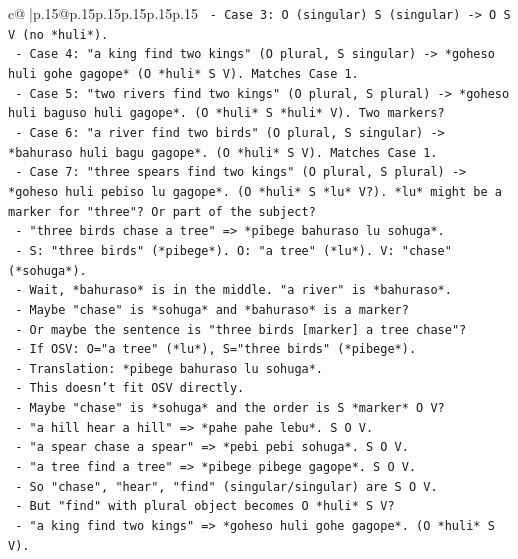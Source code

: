 \documentclass{article}
\begin{document}
{\begin{supertabular}{c@{$\;$}|p{.15\linewidth}@{}p{.15\linewidth}p{.15\linewidth}p{.15\linewidth}p{.15\linewidth}p{.15\linewidth}}
{{{\texttt{      {-} Case 3: O (singular) S (singular) {-}> O S V (no *huli*).} \\
\texttt{      {-} Case 4: "a king find two kings" (O plural, S singular) {-}> *goheso huli gohe gagope* (O *huli* S V). Matches Case 1.} \\
\texttt{      {-} Case 5: "two rivers find two kings" (O plural, S plural) {-}> *goheso huli baguso huli gagope*. (O *huli* S *huli* V). Two markers?} \\
\texttt{      {-} Case 6: "a river find two birds" (O plural, S singular) {-}> *bahuraso huli bagu gagope*. (O *huli* S V). Matches Case 1.} \\
\texttt{      {-} Case 7: "three spears find two kings" (O plural, S plural) {-}> *goheso huli pebiso lu gagope*. (O *huli* S *lu* V?). *lu* might be a marker for "three"? Or part of the subject?} \\
\texttt{      {-} "three birds chase a tree" => *pibege bahuraso lu sohuga*.} \\
\texttt{        {-} S: "three birds" (*pibege*). O: "a tree" (*lu*). V: "chase" (*sohuga*).} \\
\texttt{        {-} Wait, *bahuraso* is in the middle. "a river" is *bahuraso*.} \\
\texttt{        {-} Maybe "chase" is *sohuga* and *bahuraso* is a marker?} \\
\texttt{        {-} Or maybe the sentence is "three birds {[}marker{]} a tree chase"?} \\
\texttt{        {-} If OSV: O="a tree" (*lu*), S="three birds" (*pibege*).} \\
\texttt{        {-} Translation: *pibege bahuraso lu sohuga*.} \\
\texttt{        {-} This doesn't fit OSV directly.} \\
\texttt{        {-} Maybe "chase" is *sohuga* and the order is S *marker* O V?} \\
\texttt{        {-} "a hill hear a hill" => *pahe pahe lebu*. S O V.} \\
\texttt{        {-} "a spear chase a spear" => *pebi pebi sohuga*. S O V.} \\
\texttt{        {-} "a tree find a tree" => *pibege pibege gagope*. S O V.} \\
\texttt{        {-} So "chase", "hear", "find" (singular/singular) are S O V.} \\
\texttt{        {-} But "find" with plural object becomes O *huli* S V?} \\
\texttt{        {-} "a king find two kings" => *goheso huli gohe gagope*. (O *huli* S V).} \\
}}}
\end{supertabular}}
\end{document}
